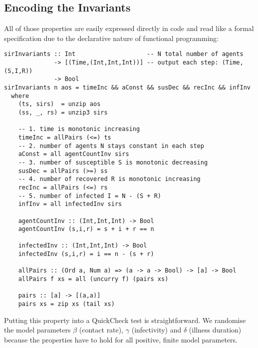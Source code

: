 \subsection{Encoding the Invariants}
All of those properties are easily expressed directly in code and read like a formal specification due to the declarative nature of functional programming:

\begin{footnotesize}
\begin{verbatim}
sirInvariants :: Int                    -- N total number of agents
              -> [(Time,(Int,Int,Int))] -- output each step: (Time,(S,I,R))
              -> Bool
sirInvariants n aos = timeInc && aConst && susDec && recInc && infInv
  where
    (ts, sirs)  = unzip aos
    (ss, _, rs) = unzip3 sirs

    -- 1. time is monotonic increasing
    timeInc = allPairs (<=) ts
    -- 2. number of agents N stays constant in each step
    aConst = all agentCountInv sirs
    -- 3. number of susceptible S is monotonic decreasing
    susDec = allPairs (>=) ss
    -- 4. number of recovered R is monotonic increasing
    recInc = allPairs (<=) rs
    -- 5. number of infected I = N - (S + R)
    infInv = all infectedInv sirs

    agentCountInv :: (Int,Int,Int) -> Bool
    agentCountInv (s,i,r) = s + i + r == n

    infectedInv :: (Int,Int,Int) -> Bool
    infectedInv (s,i,r) = i == n - (s + r)

    allPairs :: (Ord a, Num a) => (a -> a -> Bool) -> [a] -> Bool
    allPairs f xs = all (uncurry f) (pairs xs)

    pairs :: [a] -> [(a,a)]
    pairs xs = zip xs (tail xs)
\end{verbatim}
\end{footnotesize}

Putting this property into a QuickCheck test is straightforward. We randomise the model parameters $\beta$ (contact rate), $\gamma$ (infectivity) and $\delta$ (illness duration) because the properties have to hold for all positive, finite model parameters.

